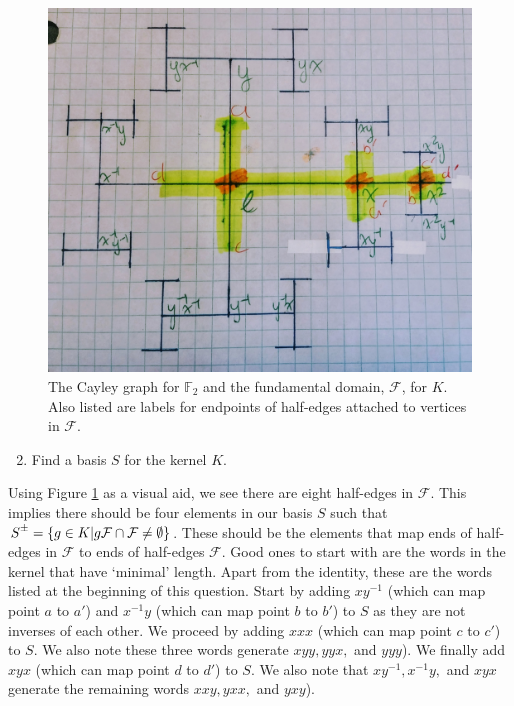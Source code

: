 \documentclass[12pt]{article}%
\newcommand{\F}{\mathbb{F}}
\newcommand{\rpm}{\raisebox{.2ex}{$\scriptstyle\pm$}}
\begin{document}
\begin{figure}[ht]
    \centering
    \includegraphics[width=1.0\textwidth]{images/fundamental_domain_for_K.jpg}
    \caption{The Cayley graph for $\F_2$ and the fundamental domain, $\mathcal{F}$, for $K$. Also listed are labels for endpoints of half-edges attached to vertices in $\mathcal{F}$.}
    \label{fig:fun_domain_of_K}
\end{figure}

\begin{enumerate}
  \setcounter{enumi}{1}
  \item Find a basis $S$ for the kernel $K$.
\end{enumerate}

Using Figure \ref{fig:fun_domain_of_K} as a visual aid, we see there are eight half-edges in $\mathcal{F}$. This implies there should be four elements in our basis $S$ such that $S^{\rpm}=\left\{g\in K | g\mathcal{F} \cap \mathcal{F} \neq \emptyset \right\}$. These should be the elements that map ends of half-edges in $\mathcal{F}$ to ends of half-edges $\mathcal{F}$.  Good ones to start with are the words in the kernel that have `minimal' length. Apart from the identity, these are the words listed at the beginning of this question. Start by adding $xy^{-1}$ (which can map point $a$ to $a'$) and $x^{-1}y$ (which can map point $b$ to $b'$) to $S$ as they are not inverses of each other. We proceed by adding $xxx$ (which can map point $c$ to $c'$) to $S$. We also note these three words generate $xyy, yyx,$ and $yyy$). We finally add $xyx$ (which can map point $d$ to $d'$) to $S$. We also note that $xy^{-1}, x^{-1}y,$ and $xyx$  generate the remaining words $xxy, yxx,$ and $yxy$). 
\end{document}
